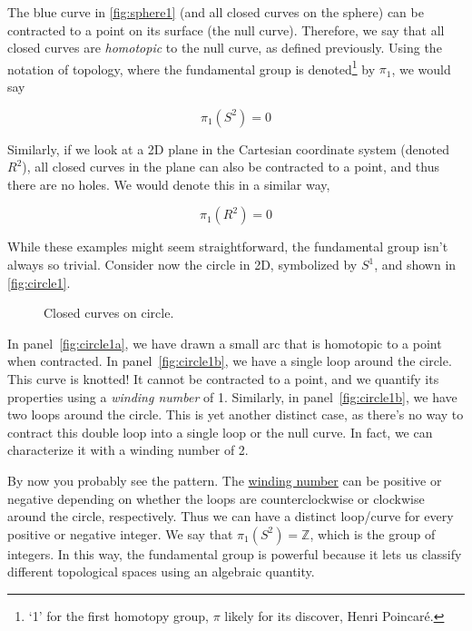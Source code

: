\documentclass[12pt, english]{book}
\begin{document}
The blue curve in \autoref{fig:sphere1} (and all closed curves on the sphere) can be contracted to a point on its surface (the null curve).
Therefore, we say that all closed curves are \emph{homotopic} to the null curve, as defined previously.
Using the notation of topology, where the fundamental group is denoted\footnote{`1' for the first homotopy group, $\pi$ likely for its discover, Henri Poincar{\'e}.} by $\pi_1$, we would say 

\begin{equation*}
	\pi_1(S^2) = 0
\end{equation*}

Similarly, if we look at a 2D plane in the Cartesian coordinate system (denoted $R^2$), all closed curves in the plane can also be contracted to a point, and thus there are no holes.
We would denote this in a similar way, 

\begin{equation*}
	\pi_1(R^2) = 0
\end{equation*}

While these examples might seem straightforward, the fundamental group isn't always so trivial.
Consider now the circle in 2D, symbolized by $S^1$, and shown in \autoref{fig:circle1}.

\begin{figure}[!ht]
	\centering 
	\caption{Closed curves on circle.}
	\label{fig:circle1}
\end{figure}

In panel~\ref{fig:circle1a}, we have drawn a small arc that is homotopic to a point when contracted. 
In panel~\ref{fig:circle1b}, we have a single loop around the circle.
This curve is knotted! 
It cannot be contracted to a point, and we quantify its properties using a \emph{winding number} of 1.
Similarly, in panel~\ref{fig:circle1b}, we have two loops around the circle.
This is yet another distinct case, as there's no way to contract this double loop into a single loop or the null curve. 
In fact, we can characterize it with a winding number of 2.

By now you probably see the pattern. 
The \href{https://en.wikipedia.org/wiki/Winding_number}{winding number} can be positive or negative depending on whether the loops are counterclockwise or clockwise around the circle, respectively.
Thus we can have a distinct loop/curve for every positive or negative integer.
We say that $\pi_1(S^2) = \mathbb{Z}$, which is the group of integers.
In this way, the fundamental group is powerful because it lets us classify different topological spaces using an algebraic quantity.
\end{document}
